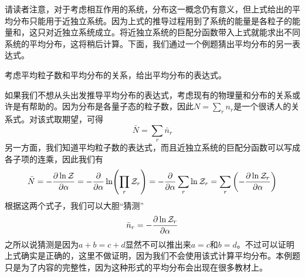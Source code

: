 \documentclass[../../main.tex]{subfiles}
\begin{document}
请读者注意，对于考虑相互作用的系统，分布这一概念仍有意义，但上式给出的平均分布只能用于近独立系统。因为上式的推导过程用到了系统的能量是各粒子的能量和，这只对近独立系统成立。将近独立系统的巨配分函数带入上式就能求出不同系统的平均分布，这将稍后计算。下面，我们通过一个例题猜出平均分布的另一表达式。
\begin{example}
    考虑平均粒子数和平均分布的关系，给出平均分布的表达式。
    \begin{solution}
        如果我们不想从头出发推导平均分布的表达式，考虑现有的物理量和分布的关系或许是有帮助的。因为分布是各量子态的粒子数，因此\(N=\sum_r n_r\)是一个很诱人的关系式。对该式取期望，可得
        \begin{equation}
            \bar{N}=\sum_r \bar{n}_r
        \end{equation}
        另一方面，我们知道平均粒子数的表达式，而且近独立系统的巨配分函数可以写成各子项的连乘，因此我们有
        \begin{equation}
            \bar{N}=-\pdv{\ln\mathcal{Z}}{\alpha}=-\pdv{\alpha}\ln(\prod_r \mathcal{Z}_r)=-\pdv{\alpha}\sum_r \ln\mathcal{Z}_r=\sum_r\left(-\pdv{\ln\mathcal{Z}_r}{\alpha}\right)
        \end{equation}
        根据这两个式子，我们可以大胆“猜测”
        \begin{equation}
            \bar{n}_r=-\pdv{\ln\mathcal{Z}_r}{\alpha}
        \end{equation}
        之所以说猜测是因为\(a+b=c+d\)显然不可以推出来\(a=c\)和\(b=d\)。不过可以证明上式确实是正确的，这里不做证明，因为我们不会使用该式计算平均分布。本例题只是为了内容的完整性，因为这种形式的平均分布会出现在很多教材上。
    \end{solution}
\end{example}
\end{document}
